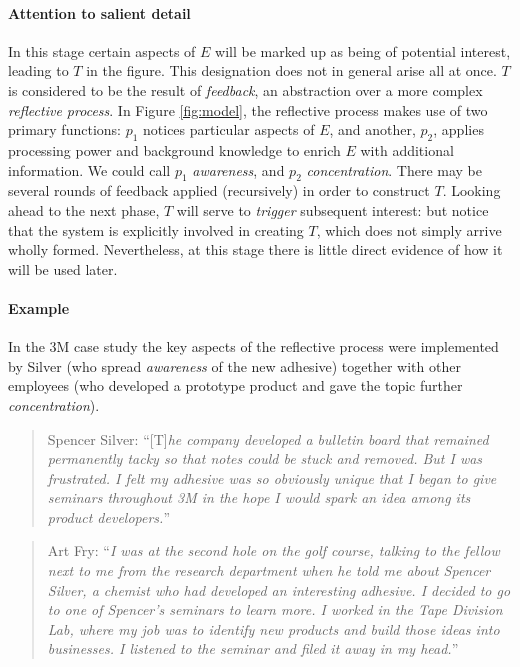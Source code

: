 \paragraph{Attention to salient detail}
In this stage certain aspects of $E$ will be marked up as being of
potential interest, leading to $T$ in the figure.  This designation
does not in general arise all at once.  $T$ is considered to be the
result of \emph{feedback}, an abstraction over a more complex
\emph{reflective process}.  In Figure \ref{fig:model}, the reflective
process makes use of two primary functions: $p_1$ notices particular
aspects of $E$, and another, $p_2$, applies processing power and
background knowledge to enrich $E$ with additional information.  We
could call $p_1$ \emph{awareness}, and $p_2$ \emph{concentration}.
There may be several rounds of feedback applied (recursively) in order
to construct $T$.  Looking ahead to the next phase, $T$ will serve to
\emph{trigger} subsequent interest: but notice that the system is
explicitly involved in creating $T$, which does not simply arrive
wholly formed.  Nevertheless, at this stage there is little direct
evidence of how it will be used later.

\paragraph{\textbf{\upshape Example}}
In the 3M case study the key aspects of the reflective process were
implemented by Silver (who spread \emph{awareness} of the new
adhesive) together with other
employees (who developed a prototype product and gave the topic further \emph{concentration}).

\begin{quote}
Spencer Silver: ``[T]\emph{he company developed a bulletin board that
  remained permanently tacky so that notes could be stuck and
  removed. But I was frustrated. I felt my adhesive was so obviously
  unique that I began to give seminars throughout 3M in the hope I
  would spark an idea among its product developers.}''
\end{quote}

\begin{quote}
Art Fry: ``\emph{I was at the second hole on the golf course, talking
  to the fellow next to me from the research department when he told
  me about Spencer Silver, a chemist who had developed an interesting
  adhesive. I decided to go to one of Spencer's seminars to learn
  more. I worked in the Tape Division Lab, where my job was to
  identify new products and build those ideas into businesses. I
  listened to the seminar and filed it away in my head.}''
\end{quote}

